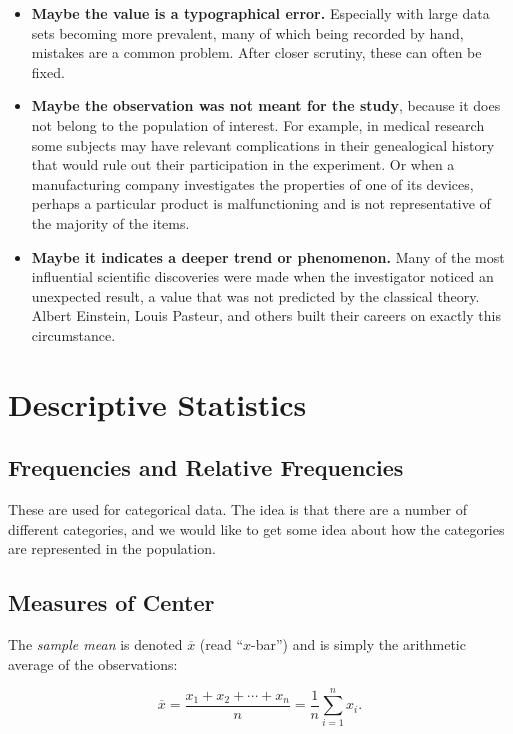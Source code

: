 \documentclass[captions=tableheading]{scrbook}
\begin{document}
\begin{itemize}
\item \textbf{Maybe the value is a typographical error.} Especially with large data sets becoming more prevalent, many of which being recorded by hand, mistakes are a common problem. After closer scrutiny, these can often be fixed.
\item \textbf{Maybe the observation was not meant for the study}, because it does not belong to the population of interest. For example, in medical research some subjects may have relevant complications in their genealogical history that would rule out their participation in the experiment. Or when a manufacturing company investigates the properties of one of its devices, perhaps a particular product is malfunctioning and is not representative of the majority of the items.
\item \textbf{Maybe it indicates a deeper trend or phenomenon.} Many of the most influential scientific discoveries were made when the investigator noticed an unexpected result, a value that was not predicted by the classical theory. Albert Einstein, Louis Pasteur, and others built their careers on exactly this circumstance.
\end{itemize}
\section{Descriptive Statistics}
\label{sec-3-3}

\label{sec:Descriptive-Statistics}
\subsection{Frequencies and Relative Frequencies}
\label{sec-3-3-1}

\label{sub:Frequencies-and-Relative}

These are used for categorical data. The idea is that there are a number of different categories, and we would like to get some idea about how the categories are represented in the population. 
\subsection{Measures of Center}
\label{sec-3-3-2}

\label{sub:Measures-of-Center}

The \emph{sample mean} is denoted \(\overline{x}\) (read ``\(x\)-bar'') and is simply the arithmetic average of the observations:

\begin{equation} 
\overline{x}=\frac{x_{1}+x_{2}+\cdots+x_{n}}{n}=\frac{1}{n}\sum_{i=1}^{n}x_{i}.
\end{equation}
\end{document}
